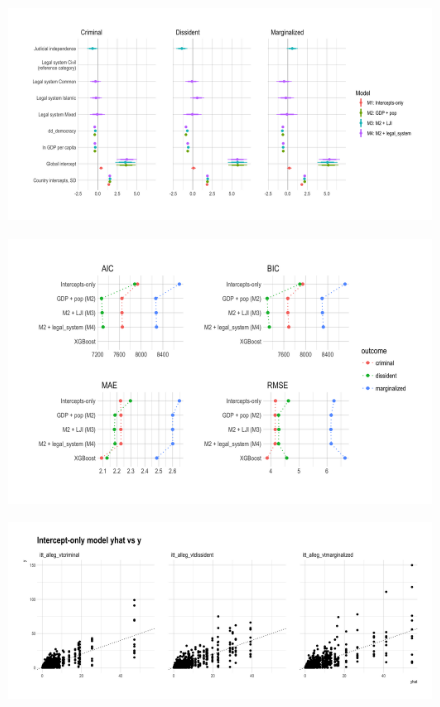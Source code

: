 \documentclass[12pt]{article}
\begin{document}
\begin{figure}
\begin{center}
\caption{}
\label{fig:coefs}
\includegraphics[width=.99\textwidth]{../output/count-model-coefs.png}
\end{center}
\end{figure}

\begin{figure}
\begin{center}
\caption{}
\label{fig:fit}
\includegraphics[width=.99\textwidth]{../output/model-fit-plot.png}
\end{center}
\end{figure}

\begin{figure}
\begin{center}
\caption{}
\includegraphics[width=.99\textwidth]{../output/mdl1-y-vs-yhat.png}
\end{center}
\end{figure}
\end{document}
